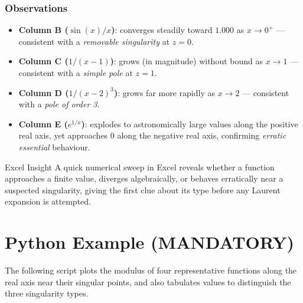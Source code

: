 \documentclass[12pt,a4paper]{article}
\begin{document}
\subsubsection*{Observations}
\begin{itemize}[leftmargin=2em]
  \item \textbf{Column B ($\sin(x)/x$)}: converges steadily toward $1.000$ as $x \to 0^+$ ---
    consistent with a \emph{removable singularity} at $z = 0$.
  \item \textbf{Column C ($1/(x-1)$)}: grows (in magnitude) without bound as $x \to 1$ ---
    consistent with a \emph{simple pole} at $z = 1$.
  \item \textbf{Column D ($1/(x-2)^3$)}: grows far more rapidly as $x \to 2$ ---
    consistent with a \emph{pole of order 3}.
  \item \textbf{Column E ($e^{1/x}$)}: explodes to astronomically large values along the positive
    real axis, yet approaches $0$ along the negative real axis, confirming \emph{erratic essential}
    behaviour.
\end{itemize}

\begin{learnbox}{Excel Insight}
A quick numerical sweep in Excel reveals whether a function approaches a finite value, diverges
algebraically, or behaves erratically near a suspected singularity, giving the first clue about
its type before any Laurent expansion is attempted.
\end{learnbox}

\section{Python Example (MANDATORY)}

The following script plots the modulus of four representative functions along the real axis near
their singular points, and also tabulates values to distinguish the three singularity types.
\end{document}
